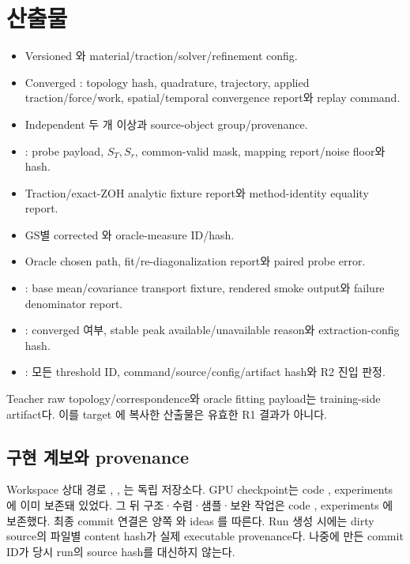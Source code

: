\documentclass[10pt]{article}
\begin{document}
\section{산출물}
\label{sec:r1-chapter-6}
\label{sec:r1-artifacts}

\begin{itemize}
  \item Versioned 와 material/traction/solver/refinement config.
  \item Converged : topology hash, quadrature, trajectory, applied traction/force/work,
  spatial/temporal convergence report와 replay command.
  \item Independent  두 개 이상과 source-object group/provenance.
  \item {}: probe payload, \(S_T,S_r\), common-valid mask, mapping report/noise floor와 hash.
  \item Traction/exact-ZOH analytic fixture report와 method-identity equality report.
  \item GS별 corrected 와 oracle-measure ID/hash.
  \item Oracle chosen path, fit/re-diagonalization report와 paired probe error.
  \item {}: base mean/covariance transport fixture, rendered smoke output와 failure denominator report.
  \item {}: converged 여부, stable peak available/unavailable reason와 extraction-config hash.
  \item {}: 모든 threshold ID, command/source/config/artifact hash와 R2 진입 판정.
\end{itemize}

Teacher raw topology/correspondence와 oracle fitting payload는 training-side artifact다.
이를 target 에 복사한 산출물은 유효한 R1 결과가 아니다.

\subsection{구현 계보와 provenance}

Workspace 상대 경로 , , 는 독립 저장소다.
GPU checkpoint는 code , experiments 에 이미 보존돼 있었다.
그 뒤 구조·수렴·샘플·보완 작업은 code , experiments 에 보존했다.
최종 commit 연결은 양쪽 와
ideas 를 따른다.
Run 생성 시에는 dirty source의 파일별 content hash가 실제 executable provenance다.
나중에 만든 commit ID가 당시 run의 source hash를 대신하지 않는다.
\end{document}
